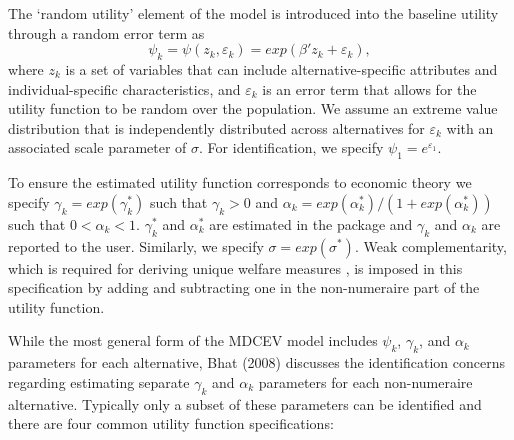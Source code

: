 The `random utility' element of the model is introduced into the
baseline utility through a random error term as \begin{equation}
\label{eq:psi}
\psi_k=\psi(z_k,\varepsilon_k)= exp(\beta'z_k+\varepsilon_k),
\end{equation} \noindent where \(z_k\) is a set of variables that can
include alternative-specific attributes and individual-specific
characteristics, and \(\varepsilon_k\) is an error term that allows for
the utility function to be random over the population. We assume an
extreme value distribution that is independently distributed across
alternatives for \(\varepsilon_k\) with an associated scale parameter of
\(\sigma\). For identification, we specify
\(\psi_1= e^{\varepsilon_1}\).

To ensure the estimated utility function corresponds to economic theory
we specify \(\gamma_k = exp(\gamma^*_k)\) such that \(\gamma_k > 0\) and
\(\alpha_k = exp(\alpha^*_k)/(1 + exp(\alpha^*_k))\) such that
\(0 < \alpha_k < 1\). \(\gamma^*_k\) and \(\alpha^*_k\) are estimated in
the package and \(\gamma_k\) and \(\alpha_k\) are reported to the user.
Similarly, we specify \(\sigma = exp(\sigma^*)\). Weak complementarity,
which is required for deriving unique welfare measures
\citep{malerenvironment1974}, is imposed in this specification by adding
and subtracting one in the non-numeraire part of the utility function.

While the most general form of the MDCEV model includes \(\psi_k\),
\(\gamma_k\), and \(\alpha_k\) parameters for each alternative, Bhat
(2008) discusses the identification concerns regarding estimating
separate \(\gamma_k\) and \(\alpha_k\) parameters for each non-numeraire
alternative. Typically only a subset of these parameters can be
identified and there are four common utility function specifications:

